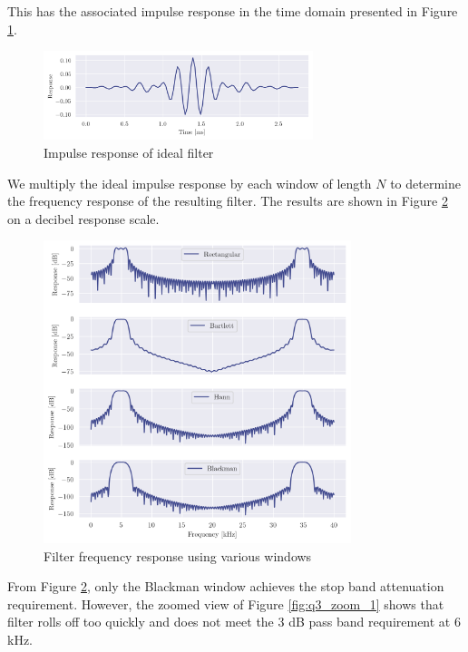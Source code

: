 This has the associated impulse response in the time domain presented in Figure \ref{fig:q3_ideal_impz}.

\begin{figure}[ht]
    \centering
    \includegraphics[width=0.7\textwidth]{images/q3_ideal_impz.png}
    \caption{Impulse response of ideal filter}
    \label{fig:q3_ideal_impz}
\end{figure}

\newpage

We multiply the ideal impulse response by each window of length $N$ to determine the frequency response of the resulting filter. The results are shown in Figure \ref{fig:q3_window_freqzs} on a decibel response scale.

\begin{figure}[ht]
    \centering
    \includegraphics[width=0.8\textwidth]{images/q3_window_freqzs.png}
    \caption{Filter frequency response using various windows}
    \label{fig:q3_window_freqzs}
\end{figure}

From Figure \ref{fig:q3_window_freqzs}, only the Blackman window achieves the stop band attenuation requirement. However, the zoomed view of Figure \ref{fig:q3_zoom_1} shows that filter rolls off too quickly and does not meet the 3 dB pass band requirement at 6 kHz.

